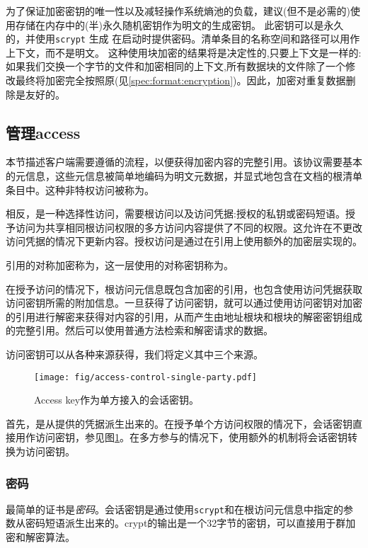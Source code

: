 为了保证加密密钥的唯一性以及减轻操作系统熵池的负载，建议(但不是必需的)使用存储在内存中的(半)永久随机密钥作为明文的生成密钥。
此密钥可以是永久的，并使用\lstinline{scrypt} \cite{percival2009stronger}生成
在启动时提供密码。清单条目的名称空间和路径可以用作上下文，而不是明文。
这种使用块加密的结果将是决定性的,只要上下文是一样的:如果我们交换一个字节的文件和加密相同的上下文,所有数据块的文件除了一个修改最终将加密完全按照原(见\ref{spec:format:encryption})。因此，加密对重复数据删除是友好的。 


\subsection{管理access\statusgreen}\label{sec:managing-access}

本节描述客户端需要遵循的流程，以便获得加密内容的完整引用。该协议需要基本的元信息，这些元信息被简单地编码为明文元数据，并显式地包含在文档的根清单条目中。这种非特权访问被称为。

相反，是一种选择性访问，需要根访问以及访问凭据:授权的私钥或密码短语。授予访问为共享相同根访问权限的多方访问内容提供了不同的权限。这允许在不更改访问凭据的情况下更新内容。授权访问是通过在引用上使用额外的加密层实现的。

引用的对称加密称为，这一层使用的对称密钥称为。

在授予访问的情况下，根访问元信息既包含加密的引用，也包含使用访问凭据获取访问密钥所需的附加信息。一旦获得了访问密钥，就可以通过使用访问密钥对加密的引用进行解密来获得对内容的引用，从而产生由地址根块和根块的解密密钥组成的完整引用。然后可以使用普通方法检索和解密请求的数据。

访问密钥可以从各种来源获得，我们将定义其中三个来源。

\begin{figure}[htbp]
\centering
\texttt{[image: fig/access-control-single-party.pdf]}
\caption[Access key作为单方访问的会话密钥\statusyellow]{Access key作为单方接入的会话密钥。}
\label{fig:access-control-single-party}
\end{figure}

首先，是从提供的凭据派生出来的。在授予单个方访问权限的情况下，会话密钥直接用作访问密钥，参见图\ref{fig:access-control-single-party}。在多方参与的情况下，使用额外的机制将会话密钥转换为访问密钥。

\subsubsection{密码}
最简单的证书是\emph{密码}。会话密钥是通过使用\lstinline{scrypt}和在根访问元信息中指定的参数从密码短语派生出来的。crypt的输出是一个32字节的密钥，可以直接用于群加密和解密算法。

